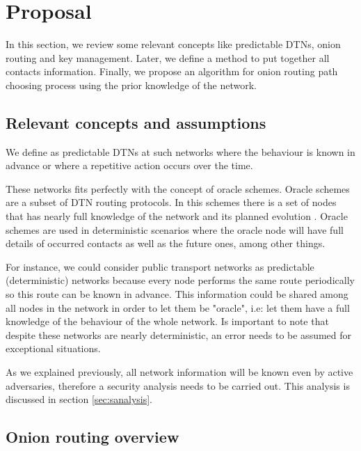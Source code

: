 \section{Proposal}\label{sec:proposal}



In this section, we review some relevant concepts like predictable DTNs, onion routing and key management. Later, we define a method to put together all contacts information. Finally, we propose an algorithm for onion routing path choosing process using the prior knowledge of the network.

\subsection{Relevant concepts and assumptions}

We define as predictable DTNs at such networks where the behaviour is known in advance or where a repetitive action occurs over the time.

These networks fits perfectly with the concept of oracle schemes. Oracle schemes are a subset of DTN routing protocols. In this schemes there is a set of nodes that has nearly full knowledge of the network and its planned evolution \cite{dtn-book}. Oracle schemes are used in deterministic scenarios where the oracle node will have full details of occurred contacts as well as the future ones, among other things. 

For instance, we could consider public transport networks as predictable (deterministic) networks because every node performs the same route periodically so this route can be known in advance. This information could be shared among all nodes in the network in order to let them be "oracle", i.e: let them have a full knowledge of the behaviour of the whole network. Is important to note that despite these networks are nearly deterministic, an error needs to be assumed for exceptional situations.

As we explained previously, all network information will be known even by active adversaries, therefore a security analysis needs to be carried out. This analysis is discussed in section \ref{sec:sanalysis}.

\subsection{Onion routing overview}

